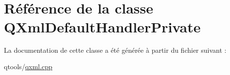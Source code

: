 \hypertarget{class_q_xml_default_handler_private}{}\section{Référence de la classe Q\+Xml\+Default\+Handler\+Private}
\label{class_q_xml_default_handler_private}


La documentation de cette classe a été générée à partir du fichier suivant \+:\begin{DoxyCompactItemize}
\item 
qtools/\hyperlink{qxml_8cpp}{qxml.\+cpp}\end{DoxyCompactItemize}
